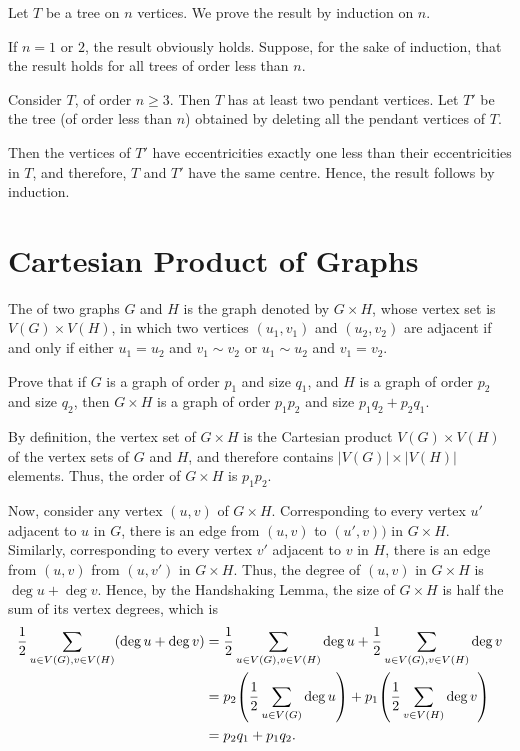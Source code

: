 \begin{Solution*}
Let $T$ be a tree on $n$ vertices. We prove the result by induction on $n$.

If $n = 1$ or $2$, the result obviously holds. Suppose, for the sake of induction, that the result holds for all trees of order less than $n$.

Consider $T$, of order $n \ge 3$. Then $T$ has at least two pendant vertices. Let $T'$ be the tree (of order less than $n$) obtained by deleting all the pendant vertices of $T$.

Then the vertices of $T'$ have eccentricities exactly one less than their eccentricities in $T$, and therefore, $T$ and $T'$ have the same centre. Hence, the result follows by induction.
\end{Solution*}


\section{Cartesian Product of Graphs}\label{sec:CartProds}

The  of two graphs $G$ and $H$ is the graph denoted by $G \times H$, whose vertex set is $V(G) \times V(H)$, in which two vertices $(u_1, v_1)$ and $(u_2, v_2)$ are adjacent if and only if either $u_1 = u_2$ and $v_1 \sim v_2$ or $u_1 \sim u_2$ and $v_1 = v_2$.

\begin{Exercise}
	Prove that if $G$ is a graph of order $p_1$ and size $q_1$, and $H$ is a graph of order $p_2$ and size $q_2$, then $G \times H$ is a graph of order $p_1 p_2$ and size $p_1 q_2 + p_2 q_1$.
\end{Exercise}

\begin{Solution*}
	By definition, the vertex set of $G \times H$ is the Cartesian product $V(G) \times V(H)$ of the vertex sets of $G$ and $H$, and therefore contains $|V(G)| \times |V(H)|$ elements. Thus, the order of $G \times H$ is $p_1 p_2$.
	
	Now, consider any vertex $(u, v)$ of $G \times H$. Corresponding to every vertex $u'$ adjacent to $u$ in $G$, there is an edge from $(u, v)$ to $(u', v))$ in $G \times H$. Similarly, corresponding to every vertex $v'$ adjacent to $v$ in $H$, there is an edge from $(u, v)$ from $(u, v')$ in $G \times H$. Thus, the degree of $(u, v)$ in $G \times H$ is $\deg u + \deg v$. Hence, by the Handshaking Lemma, the size of $G \times H$ is half the sum of its vertex degrees, which is
	\begin{align*}
		\frac 1 2 \sum_{u \in V(G), v \in V(H)} (\deg u + \deg v) & = \frac 1 2 \sum_{u \in V(G), v \in V(H)} \deg u + \frac 1 2 \sum_{u \in V(G), v \in V(H)} \deg v \\
		& = p_2 \pqty{\frac 1 2 \sum_{u \in V(G)} \deg u} + p_1 \pqty{\frac 1 2 \sum_{v \in V(H)} \deg v} \\
		& = p_2 q_1 + p_1 q_2.
	\end{align*}
\end{Solution*}

